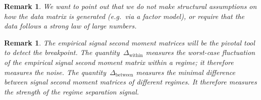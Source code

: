 \documentclass[10pt, letterpaper]{amsart}
\newtheorem{remark}[theorem]{Remark}
\begin{document}
\begin{remark}
    We want to point out that we do not make structural assumptions on how the data matrix is generated (e.g.~via a factor model), or require that the data follows a strong law of large numbers. 
\end{remark}

\begin{remark}\label{rem:interpretaion_signal_noise}
The empirical signal second moment matrices will be the pivotal tool to detect the breakpoint. The quantity~$\Delta_{\text{within}}$ measures the worst-case fluctuation of the empirical signal second moment matrix within a regime; it therefore measures the noise. The quantity~$\Delta_{\text{between}}$ measures the minimal difference between signal second moment matrices of different regimes. It therefore measures the strength of the regime separation signal.
\end{remark}
\end{document}
